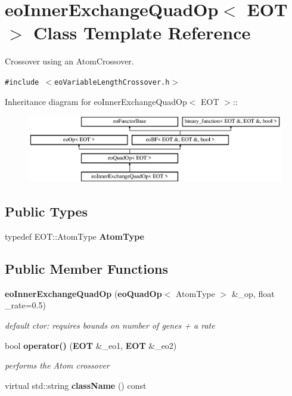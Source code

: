 \section{eo\-Inner\-Exchange\-Quad\-Op$<$ EOT $>$ Class Template Reference}
\label{classeo_inner_exchange_quad_op}
Crossover using an Atom\-Crossover.  


{\tt \#include $<$eo\-Variable\-Length\-Crossover.h$>$}

Inheritance diagram for eo\-Inner\-Exchange\-Quad\-Op$<$ EOT $>$::\begin{figure}[H]
\begin{center}
\leavevmode
\includegraphics[height=2.96296cm]{classeo_inner_exchange_quad_op}
\end{center}
\end{figure}
\subsection*{Public Types}
\begin{CompactItemize}
\item 
typedef EOT::Atom\-Type {\bf Atom\-Type}\label{classeo_inner_exchange_quad_op_w0}

\end{CompactItemize}
\subsection*{Public Member Functions}
\begin{CompactItemize}
\item 
{\bf eo\-Inner\-Exchange\-Quad\-Op} ({\bf eo\-Quad\-Op}$<$ Atom\-Type $>$ \&\_\-op, float \_\-rate=0.5)\label{classeo_inner_exchange_quad_op_a0}

\begin{CompactList}\small\item\em default ctor: requires bounds on number of genes + a rate \item\end{CompactList}\item 
bool {\bf operator()} ({\bf EOT} \&\_\-eo1, {\bf EOT} \&\_\-eo2)\label{classeo_inner_exchange_quad_op_a1}

\begin{CompactList}\small\item\em performs the Atom crossover \item\end{CompactList}\item 
virtual std::string {\bf class\-Name} () const \label{classeo_inner_exchange_quad_op_a2}

\end{CompactItemize}
